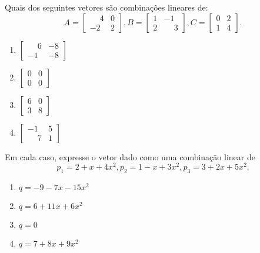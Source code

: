 \documentclass[12pt]{exam}
\begin{document}
\begin{exercicio}
    Quais dos seguintes vetores são combinações lineares de:
    \[
        A = \begin{bmatrix}
            \phantom{-} 4 & 0\\-2 & 2
        \end{bmatrix},
        B = \begin{bmatrix}
            1 & -1\\2 & \phantom{-} 3
        \end{bmatrix},
        C = \begin{bmatrix}
            0 & 2\\1 & 4
        \end{bmatrix}.
    \]
    \begin{multicols}{2}
        \begin{enumerate}[label={\alph*})]
            \item $\begin{bmatrix}
                \phantom{-} 6 & -8\\-1 & -8
            \end{bmatrix}$

            \item $\begin{bmatrix}
                0 & 0\\0 & 0
            \end{bmatrix}$

            \item $\begin{bmatrix}
                6 & 0\\3 & 8
            \end{bmatrix}$

            \item $\begin{bmatrix}
                -1 & 5\\\phantom{-} 7 & 1
            \end{bmatrix}$
        \end{enumerate}
    \end{multicols}
\end{exercicio}

\begin{exercicio}
    Em cada caso, expresse o vetor dado como uma combinação linear de
    \[
        p_1 = 2 + x + 4x^2,
        p_2 = 1 - x + 3x^2,
        p_3 = 3 + 2x + 5x^2.
    \]
    \begin{multicols}{2}
        \begin{enumerate}[label={\alph*})]
            \item $q = -9 -7x - 15x^2$

            \item $q = 6 + 11x + 6x^2$

            \item $q = 0$

            \item $q = 7 + 8x + 9x^2$
        \end{enumerate}
    \end{multicols}
\end{exercicio}
\end{document}
